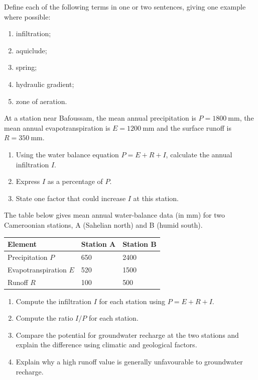 \documentclass[11pt]{article}
\newcounter{popsec}
\newcounter{popsub}
\newcommand{\courssub}[1]{%
  \stepcounter{popsub}%
  \par\vspace{9pt}\noindent{\popxbold\fontsize{11.5}{13}\selectfont\color{popink}{\color{poporange}\thepopsec.\thepopsub}\hspace{6pt}#1}\par\nopagebreak\vspace{4pt}
}
\begin{document}
\begin{exercice}[Definitions]
Define each of the following terms in one or two sentences, giving one example where possible:
\begin{enumerate}
\item infiltration;
\item aquiclude;
\item spring;
\item hydraulic gradient;
\item zone of aeration.
\end{enumerate}
\end{exercice}

\begin{exercice}
At a station near Bafoussam, the mean annual precipitation is $P = 1800\ \mathrm{mm}$, the mean annual evapotranspiration is $E = 1200\ \mathrm{mm}$ and the surface runoff is $R = 350\ \mathrm{mm}$.
\begin{enumerate}
\item Using the water balance equation $P = E + R + I$, calculate the annual infiltration $I$.
\item Express $I$ as a percentage of $P$.
\item State one factor that could increase $I$ at this station.
\end{enumerate}
\end{exercice}

\courssub{I practise}

\begin{exercice}
The table below gives mean annual water-balance data (in mm) for two Cameroonian stations, A (Sahelian north) and B (humid south).

\begin{center}
\begin{tabularx}{\linewidth}{|l|X|X|}
\hline
\rowcolor{popblueL} Element & Station A & Station B \\
\hline
Precipitation $P$ & 650 & 2400 \\
\hline
Evapotranspiration $E$ & 520 & 1500 \\
\hline
Runoff $R$ & 100 & 500 \\
\hline
\end{tabularx}
\end{center}

\begin{enumerate}
\item Compute the infiltration $I$ for each station using $P = E + R + I$.
\item Compute the ratio $I/P$ for each station.
\item Compare the potential for groundwater recharge at the two stations and explain the difference using climatic and geological factors.
\item Explain why a high runoff value is generally unfavourable to groundwater recharge.
\end{enumerate}
\end{exercice}
\end{document}
